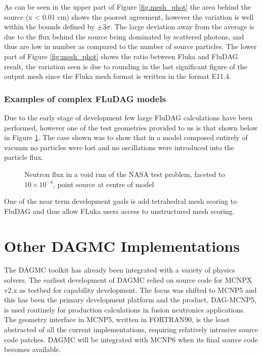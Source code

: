 \documentclass{anstrans}[11pt]
\begin{document}
As can be seen in the upper part of Figure \ref{fig:mesh_phot} the area behind the source 
(x < 0.01 cm) shows the poorest agreement, however the variation is well within the 
bounds defined by $\pm 3\sigma$. The large deviation away from the average is due to 
the flux behind the source being dominated by scattered photons, and thus are low in 
number as compared to the number of source particles.  The lower part of Figure 
\ref{fig:mesh_phot} shows the ratio between Fluka and FluDAG result, the variation seen is 
due to rounding in the last significant figure of the output mesh since the Fluka mesh format is written 
 in the format E11.4. 

\subsubsection{Examples of complex FLuDAG models}
Due to the early stage of development few large FluDAG calculations have been performed, however
one of the test geometries provided to us is that shown below in Figure \ref{nasa_mesh}. The case shown
was to show that in a model composed entirely of vacuum no particles were lost and no oscillations were
introduced into the particle flux.

\begin{figure}[h!]
        \begin{center}
                \caption{Neutron flux in a void run of the NASA test problem, 
                         faceted to $10\times10^{-4}$, point source at centre of model}
        \end{center}
    \label{nasa_mesh}
\end{figure}
One of the near term development goals is add tetrahedral mesh scoring to FluDAG and thus allow
FLuka users access to unstructured mesh scoring.


\section{Other DAGMC Implementations}

The DAGMC toolkit has already been integrated with a variety of
physics solvers.  The earliest development of DAGMC relied on source
code for MCNPX v2.x as testbed for capability development.  The focus
was shifted to MCNP5 and this has been the primary development
platform and the product, DAG-MCNP5, is used routinely for production
calculations in fusion neutronics applications.  The geometry
interface in MCNP5, written in FORTRAN90, is the least abstracted of
all the current implementations, requiring relatively intrusive source
code patches.  DAGMC will be integrated with MCNP6 when its final source
code becomes available.
\end{document}
